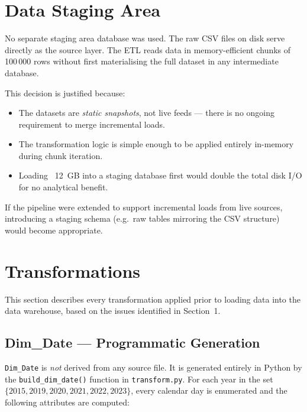 \documentclass[12pt,a4paper]{article}
\begin{document}
\section{Data Staging Area}

No separate staging area database was used. The raw CSV files on disk serve
directly as the source layer. The ETL reads data in memory-efficient chunks
of 100\,000 rows without first materialising the full dataset in any
intermediate database.

This decision is justified because:

\begin{itemize}
    \item The datasets are \emph{static snapshots}, not live feeds — there is
          no ongoing requirement to merge incremental loads.
    \item The transformation logic is simple enough to be applied entirely
          in-memory during chunk iteration.
    \item Loading ~12~GB into a staging database first would double the total
          disk I/O for no analytical benefit.
\end{itemize}

If the pipeline were extended to support incremental loads from live sources,
introducing a staging schema (e.g.\ raw tables mirroring the CSV structure)
would become appropriate.

\section{Transformations}

This section describes every transformation applied prior to loading data into
the data warehouse, based on the issues identified in Section~1.

\subsection{Dim\_Date — Programmatic Generation}

\texttt{Dim\_Date} is \emph{not} derived from any source file. It is
generated entirely in Python by the \texttt{build\_dim\_date()} function in
\texttt{transform.py}. For each year in the set
$\{2015, 2019, 2020, 2021, 2022, 2023\}$, every calendar day is enumerated
and the following attributes are computed:
\end{document}
